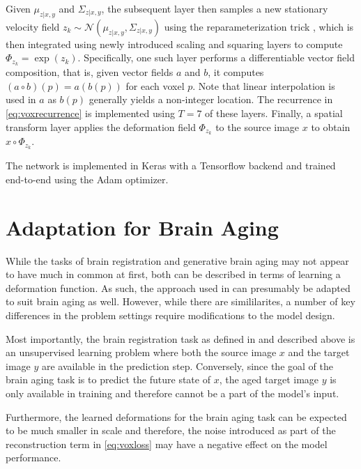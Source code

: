 \begin{figure}
	\centering
	
	\caption{}
	\label{fig:archvox}
\end{figure}

Given $\mu_{z | x, y}$ and $\Sigma_{z | x, y}$, the subsequent layer then samples a new stationary velocity field $ { z_k \sim \mathcal{N}(\mu_{z | x, y}, \Sigma_{z | x, y}) } $ using the reparameterization trick \cite{kingma2013auto}, which is then integrated using newly introduced scaling and squaring layers to compute $\Phi_{z_k} = \exp(z_k)$. Specifically, one such layer performs a differentiable vector field composition, that is, given vector fields $a$ and $b$, it computes $(a \circ b)(p) = a(b(p))$ for each voxel $p$. Note that linear interpolation is used in $a$ as $b(p)$ generally yields a non-integer location. The recurrence in \autoref{eq:voxrecurrence} is implemented using $T = 7$ of these layers. Finally, a spatial transform layer applies the deformation field $\Phi_{z_k}$ to the source image $x$ to obtain $x \circ \Phi_{z_k}$.

The network is implemented in Keras with a Tensorflow backend and trained end-to-end using the Adam \cite{kingma2014adam} optimizer.

\section{Adaptation for Brain Aging}
While the tasks of brain registration and generative brain aging may not appear to have much in common at first, both can be described in terms of learning a deformation function. As such, the approach used in \cite{balakrishnan2019voxelmorph} can presumably be adapted to suit brain aging as well. However, while there are simililarites, a number of key differences in the problem settings require modifications to the model design.

Most importantly, the brain registration task as defined in \cite{balakrishnan2019voxelmorph} and described above is an unsupervised learning problem where both the source image $x$ and the target image $y$ are available in the prediction step. Conversely, since the goal of the brain aging task is to predict the future state of $x$, the aged target image $y$ is only available in training and therefore cannot be a part of the model's input.

Furthermore, the learned deformations for the brain aging task can be expected to be much smaller in scale and therefore, the noise introduced as part of the reconstruction term in \autoref{eq:voxloss} may have a negative effect on the model performance.

